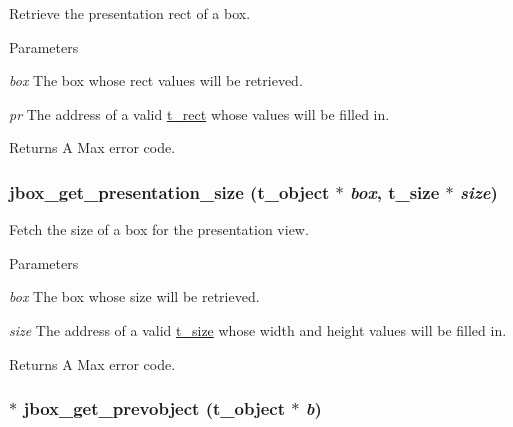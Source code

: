 Retrieve the presentation rect of a box. 
\begin{DoxyParams}{Parameters}
\item[{\em box}]The box whose rect values will be retrieved. \item[{\em pr}]The address of a valid \hyperlink{structt__rect}{t\_\-rect} whose values will be filled in. \end{DoxyParams}
\begin{DoxyReturn}{Returns}
A Max error code. 
\end{DoxyReturn}
\hypertarget{group__jbox_ga4dc98cdc8f15efc5f0980bd4cc07f111}{
\subsubsection[{jbox\_\-get\_\-presentation\_\-size}]{ jbox\_\-get\_\-presentation\_\-size ({\bf t\_\-object} $\ast$ {\em box}, \/  {\bf t\_\-size} $\ast$ {\em size})}}
\label{group__jbox_ga4dc98cdc8f15efc5f0980bd4cc07f111}


Fetch the size of a box for the presentation view. 
\begin{DoxyParams}{Parameters}
\item[{\em box}]The box whose size will be retrieved. \item[{\em size}]The address of a valid \hyperlink{structt__size}{t\_\-size} whose width and height values will be filled in. \end{DoxyParams}
\begin{DoxyReturn}{Returns}
A Max error code. 
\end{DoxyReturn}
\hypertarget{group__jbox_ga99be7a7b57c38335d30e6241afb86a5b}{
\subsubsection[{jbox\_\-get\_\-prevobject}]{$\ast$ jbox\_\-get\_\-prevobject ({\bf t\_\-object} $\ast$ {\em b})}}
\label{group__jbox_ga99be7a7b57c38335d30e6241afb86a5b}


